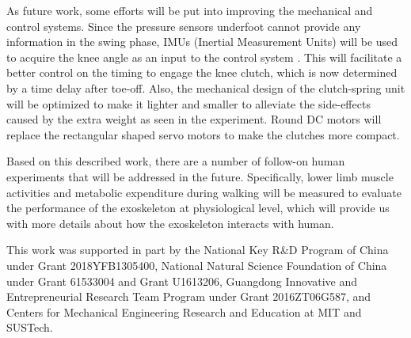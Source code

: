 \documentclass[twocolumn,cleanfoot,10pt]{asme2ej}
\begin{document}
As future work, some efforts will be put into improving the mechanical and control systems.
Since the pressure sensors underfoot cannot provide any information in the swing phase, IMUs (Inertial Measurement Units) will be used to acquire the knee angle as an input to the control system \cite{IMU2}.
This will facilitate a better control on the timing to engage the knee clutch, which is now determined by a time delay after toe-off.
Also, the mechanical design of the clutch-spring unit will be optimized to make it lighter and smaller to alleviate the side-effects caused by the extra weight as seen in the experiment.
Round DC motors will replace the rectangular shaped servo motors to make the clutches more compact. 

Based on this described work, there are a number of follow-on human experiments that will be addressed in the future.
Specifically, lower limb muscle activities and metabolic expenditure during walking will be measured to evaluate the performance of the exoskeleton at physiological level, which will provide us with more details about how the exoskeleton interacts with human.

\begin{acknowledgment}
This work was supported in part by the National Key R\&D Program of China under Grant 2018YFB1305400, National Natural Science Foundation of China under Grant 61533004 and Grant U1613206, Guangdong Innovative and Entrepreneurial Research Team Program under Grant 2016ZT06G587, and Centers for Mechanical Engineering Research and Education at MIT and SUSTech.
\end{acknowledgment}

%



%


\clearpage
\listoffigures
\clearpage
\listoftables
\end{document}
